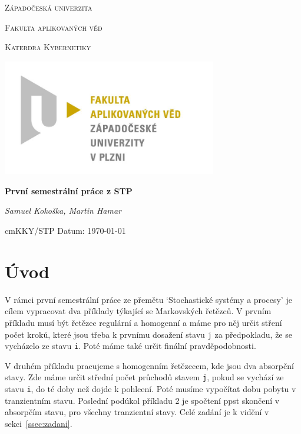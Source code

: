 \documentclass{article}
\begin{document}
\begin{titlepage}

\centering

{\scshape\LARGE Západočeská univerzita\par}
{\scshape\Large Fakulta aplikovaných věd \par}
{\scshape\Large Katerdra Kybernetiky \par}
{\begin{center}
    \includegraphics[width=0.7\textwidth]{pic/fav.jpg} 
\end{center}}

{\huge\bfseries První semestrální práce z STP \par}

\vspace{2cm}

{\Large\itshape Samuel Kokoška, Martin Hamar\par}

\vfill

\vspace{1cm}

 cm{KKY/STP} \hfill {Datum: \today }



\end{titlepage}

\section{Úvod}
V rámci první semestrální práce ze přemětu `Stochastické systémy a procesy' je cílem vypracovat dva příklady týkající se Markovských řetězců.
V prvním příkladu musí být řetězec regulární a homogenní a máme pro něj určit stření počet kroků, které jsou třeba k prvnímu dosažení stavu \verb|j| za předpokladu, že se vycházelo ze stavu \verb|i|. Poté máme také určit finální pravděpodobnosti.

V druhém příkladu pracujeme s homogenním řetězecem, kde jsou dva absorpční stavy. 
Zde máme určit střední počet průchodů stavem \verb|j|, pokud se vychází ze stavu \verb|i|, do té doby než dojde k pohlcení. Poté musíme vypočítat dobu pobytu v tranzientním stavu. Poslední podúkol příkladu 2 je spočtení ppst skončení v absorpčím stavu, pro všechny tranzientní stavy.
Celé zadání je k vidění v sekci~\ref{ssec:zadani}. 
\end{document}

